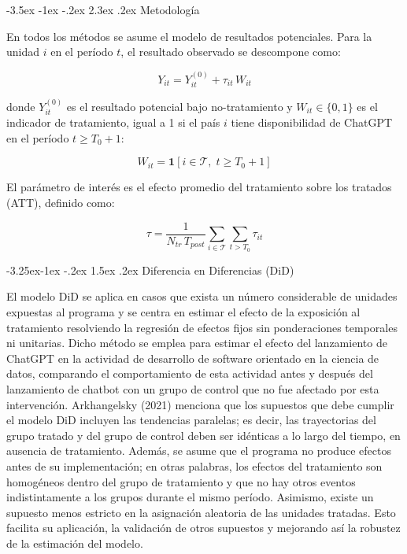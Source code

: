 \documentclass[12pt,a4paper]{article}
\makeatletter
\renewcommand\section{\@startsection{section}{1}{\z@}%
  {-3.5ex \@plus -1ex \@minus -.2ex}%
  {2.3ex \@plus.2ex}%
  {\normalfont\normalsize}}
\renewcommand\subsection{\@startsection{subsection}{2}{\z@}%
  {-3.25ex\@plus -1ex \@minus -.2ex}%
  {1.5ex \@plus .2ex}%
  {\normalfont\normalsize}}
\makeatother
\begin{document}
\clearpage
\section{Metodología}\label{sec:metodologia}

En todos los métodos se asume el modelo de resultados potenciales. Para la unidad $i$ en el período $t$, el resultado observado se descompone como:

\[
Y_{it} = Y_{it}^{(0)} + \tau_{it}\, W_{it}
\]

donde $Y_{it}^{(0)}$ es el resultado potencial bajo no-tratamiento y $W_{it} \in \{0,1\}$ es el indicador de tratamiento, igual a 1 si el país $i$ tiene disponibilidad de ChatGPT en el período $t \geq T_0 + 1$:

\[
W_{it} = \mathbf{1}\!\left[i \in \mathcal{T},\; t \geq T_0 + 1\right]
\]

El parámetro de interés es el efecto promedio del tratamiento sobre los tratados (ATT), definido como:

\[
\tau = \frac{1}{N_{tr}\, T_{post}} \sum_{i \in \mathcal{T}}\sum_{t > T_0} \tau_{it}
\]


\subsection{Diferencia en Diferencias (DiD)}

El modelo DiD se aplica en casos que exista un número considerable de unidades expuestas al programa y se centra en estimar el efecto de la exposición al tratamiento resolviendo la regresión de efectos fijos sin ponderaciones temporales ni unitarias. Dicho método se emplea para estimar el efecto del lanzamiento de ChatGPT en la actividad de desarrollo de software orientado en la ciencia de datos, comparando el comportamiento de esta actividad antes y después del lanzamiento de chatbot con un grupo de control que no fue afectado por esta intervención. Arkhangelsky (2021) menciona que los supuestos que debe cumplir el modelo DiD incluyen las tendencias paralelas; es decir, las trayectorias del grupo tratado y del grupo de control deben ser idénticas a lo largo del tiempo, en ausencia de tratamiento. Además, se asume que el programa no produce efectos antes de su implementación; en otras palabras, los efectos del tratamiento son homogéneos dentro del grupo de tratamiento y que no hay otros eventos indistintamente a los grupos durante el mismo período. Asimismo, existe un supuesto menos estricto en la asignación aleatoria de las unidades tratadas. Esto facilita su aplicación, la validación de otros supuestos y mejorando así la robustez de la estimación del modelo.
\end{document}
